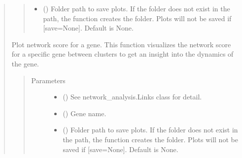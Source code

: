 \documentclass[letterpaper,10pt,english]{sphinxmanual}
\begin{document}
\begin{quote}
\begin{fulllineitems}
\begin{fulllineitems}
\begin{quote}
\begin{description}
\begin{itemize}
\item {} 
 () \textendash{} Folder path to save plots. If the folder does not exist in the path, the function creates the folder.
Plots will not be saved if {[}save=None{]}. Default is None.

\end{itemize}

\end{description}\end{quote}

\end{fulllineitems}


\begin{fulllineitems}
\label{\detokenize{modules/celloracle.network_analysis:celloracle.network_analysis.Links.plot_score_per_cluster}}
Plot network score for a gene.
This function visualizes the network score for a specific gene between clusters to get an insight into the dynamics of the gene.
\begin{quote}\begin{description}
\item[{Parameters}] \leavevmode\begin{itemize}
\item {} 
 ({\hyperref[\detokenize{modules/celloracle:celloracle.Links}]{}}) \textendash{} See network\_analysis.Links class for detail.

\item {} 
 () \textendash{} Gene name.

\item {} 
 () \textendash{} Folder path to save plots. If the folder does not exist in the path, the function creates the folder.
Plots will not be saved if {[}save=None{]}. Default is None.


\end{itemize}
\end{description}
\end{quote}
\end{fulllineitems}
\end{fulllineitems}
\end{quote}
\end{document}
